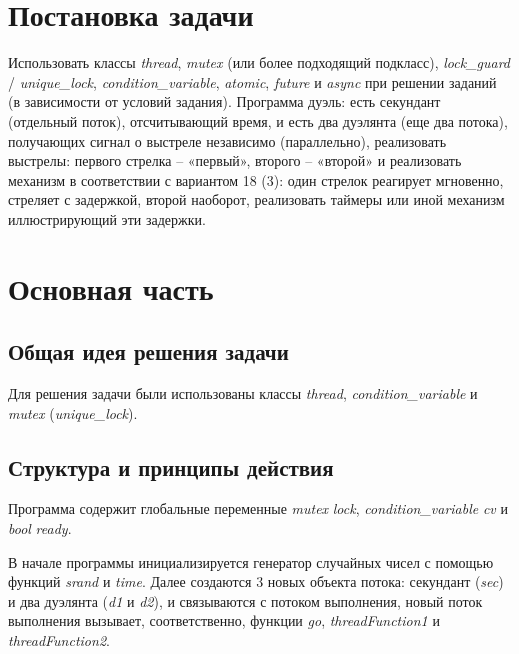 \documentclass[a4paper,14pt]{article}
\begin{document}

\setcounter{page}{2} %

\renewcommand\contentsname{\centering {\normalsize Содержание}}
\tableofcontents
\newpage

\section*{Постановка задачи}

Использовать классы \textit{thread}, \textit{mutex} (или более подходящий подкласс), \textit{lock\_guard} / \textit{unique\_lock}, \textit{condition\_variable}, \textit{atomic}, \textit{future} и \textit{async} при решении заданий (в зависимости от условий задания).
Программа дуэль: есть секундант (отдельный поток), отсчитывающий время, и есть два дуэлянта (еще два потока), получающих сигнал о выстреле независимо (параллельно), реализовать выстрелы: первого стрелка – «первый», второго – «второй» и реализовать механизм в соответствии с вариантом 18 (3):
один стрелок реагирует мгновенно, стреляет с задержкой, второй наоборот, реализовать таймеры или иной механизм иллюстрирующий эти задержки.

\newpage

\section{Основная часть}
\subsection{Общая идея решения задачи}
Для решения задачи были использованы классы \textit{thread}, \textit{condition\_variable} и \textit{mutex} (\textit{unique\_lock}).
\subsection{Структура и принципы действия}
Программа содержит глобальные переменные \textit{mutex} \textit{lock}, \textit{condition\_variable} \textit{cv} и \textit{bool} \textit{ready}.

В начале программы инициализируется генератор случайных чисел с помощью функций \textit{srand} и \textit{time}. Далее создаются 3 новых объекта потока: секундант (\textit{sec}) и два дуэлянта (\textit{d1} и \textit{d2}), и связываются с потоком выполнения, новый поток выполнения вызывает, соответственно, функции \textit{go}, \textit{threadFunction1} и \textit{threadFunction2}.
\end{document}
